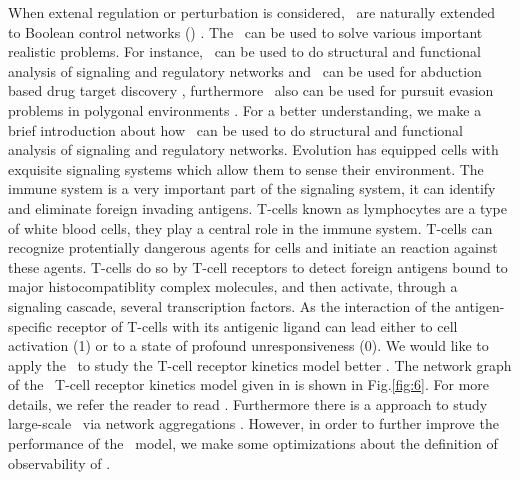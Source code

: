 When extenal regulation or perturbation is considered, \BNs\ are naturally extended to Boolean control networks (\BCNs) \cite{Ideker2001A}. The \BCNs\ can be used to solve various important realistic problems. For instance, \BCNs\ can be used to do structural and functional analysis of  signaling and regulatory networks \cite{Kaufman1999A, Klamt2006A} and \BCNs\ can be used for abduction based drug target discovery \cite{Biane2017Abduction}, furthermore \BCNs\ also can be used for pursuit evasion problems in polygonal environments \cite{Thunberg2011A}. For a better understanding, we make a brief introduction about how  \BCNs\ can be used to do structural and functional analysis of signaling and regulatory networks. Evolution has equipped cells with exquisite signaling systems which allow them to sense their environment. The immune system is a very important part of the signaling system, it can identify and eliminate foreign invading antigens. T-cells known as lymphocytes are a type of white blood cells, they play a central role in the immune system. T-cells can recognize protentially dangerous agents for cells and initiate an reaction against these agents. T-cells do so by T-cell receptors to detect foreign antigens bound to major histocompatiblity complex molecules, and then activate, through a signaling cascade, several transcription factors. As the interaction of the antigen-specific receptor of T-cells with its antigenic ligand can lead either to cell activation (1) or to a state of profound unresponsiveness (0). We would like to apply the \BCNs\ to study the T-cell receptor kinetics model better \cite{Kaufman1999A, Klamt2006A}. The network graph of the \BCN\ T-cell receptor kinetics model given in \cite{Klamt2006A} is shown in Fig.\ref{fig:6}. For more details, we refer the reader to read \cite{Klamt2006A}. Furthermore there is a approach to study large-scale \BCNs\ via network aggregations \cite{Zhang2017Observability}. However, in order to further improve the performance of the \BCN\ model, we make some optimizations about the definition of observability of \BCNs.
